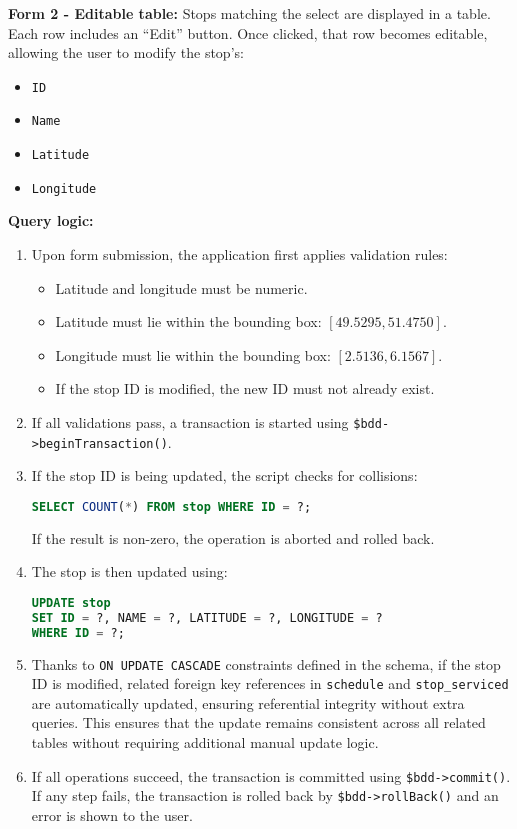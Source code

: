 \documentclass[a4paper, 12pt]{article}
\begin{document}
\textbf{Form 2 - Editable table:}  
Stops matching the select are displayed in a table. Each row includes an “Edit” button. Once clicked, that row becomes editable, allowing the user to modify the stop’s:

\begin{itemize}
    \item \texttt{ID}
    \item \texttt{Name}
    \item \texttt{Latitude}
    \item \texttt{Longitude}
\end{itemize}

\textbf{Query logic:}
\begin{enumerate}
    \item Upon form submission, the application first applies validation rules:
    \begin{itemize}
        \item Latitude and longitude must be numeric.
        \item Latitude must lie within the bounding box: $[49.5295, 51.4750]$.
        \item Longitude must lie within the bounding box: $[2.5136, 6.1567]$.
        \item If the stop ID is modified, the new ID must not already exist.
    \end{itemize}

    \item If all validations pass, a transaction is started using \texttt{\$bdd->beginTransaction()}.

    \item If the stop ID is being updated, the script checks for collisions:
    \begin{lstlisting}[language=SQL]
SELECT COUNT(*) FROM stop WHERE ID = ?;
    \end{lstlisting}
    If the result is non-zero, the operation is aborted and rolled back.

    \item The stop is then updated using:
    \begin{lstlisting}[language=SQL]
UPDATE stop
SET ID = ?, NAME = ?, LATITUDE = ?, LONGITUDE = ?
WHERE ID = ?;
    \end{lstlisting}
    \item Thanks to \texttt{ON UPDATE CASCADE} constraints defined in the schema, if the stop ID is modified, related foreign key references in \texttt{schedule} and \texttt{stop\_serviced} are automatically updated, ensuring referential integrity without extra queries. This ensures that the update remains consistent across all related tables without requiring additional manual update logic.

    \item If all operations succeed, the transaction is committed using \texttt{\$bdd->commit()}. If any step fails, the transaction is rolled back by \texttt{\$bdd->rollBack()} and an error is shown to the user.
\end{enumerate}
\end{document}
